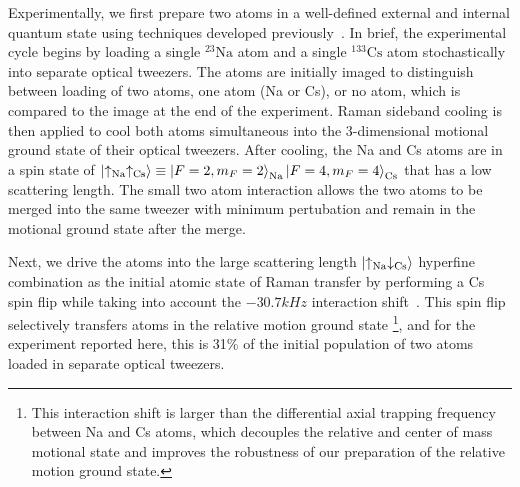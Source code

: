 \documentclass[aps,prl,twocolumn,superscriptaddress]{revtex4-1}
\begin{document}
Experimentally, we first prepare two atoms in a well-defined external and internal quantum state using techniques developed previously~\cite{Liu2018, Liu2019, Wang2019}. In brief, the experimental cycle begins by  loading a single ${}^{23}\mathrm{Na}$ atom and a single ${}^{133}\mathrm{Cs}$ atom stochastically into separate optical tweezers. The atoms are initially imaged to distinguish between loading of two atoms, one atom (Na or Cs), or no atom, which is compared to the image at the end of the experiment. Raman sideband cooling is then applied to cool both atoms simultaneous into the 3-dimensional motional ground state of their optical tweezers. After cooling, the Na and Cs atoms are in a spin state of $\ket{\uparrow_{\text{Na}}\uparrow_{\text{Cs}}}\equiv \ket{F=2,m_F=2}_{\text{Na}}\ket{F=4,m_F=4}_{\text{Cs}} $ %
that has a low scattering length. The small two atom interaction allows the two atoms to be merged into the same tweezer with minimum pertubation and remain in the motional ground state after the merge.

Next, we  drive the atoms into the large scattering length $\ket{\uparrow_{\text{Na}} \downarrow_{\text{Cs}}}$ hyperfine combination as the initial atomic state of Raman transfer by performing a Cs spin flip while taking into account the $-30.7 kHz$ interaction shift~\cite{Hood2019}.  %
This spin flip selectively transfers atoms in the relative motion ground state \footnote{This interaction shift is larger than the differential axial trapping frequency between Na and Cs atoms, which decouples the relative and center of mass motional state and improves the robustness of our preparation of the relative motion ground state.}, and for the experiment reported here, this is 31\% of the initial population of two atoms loaded in separate optical tweezers.
\end{document}
